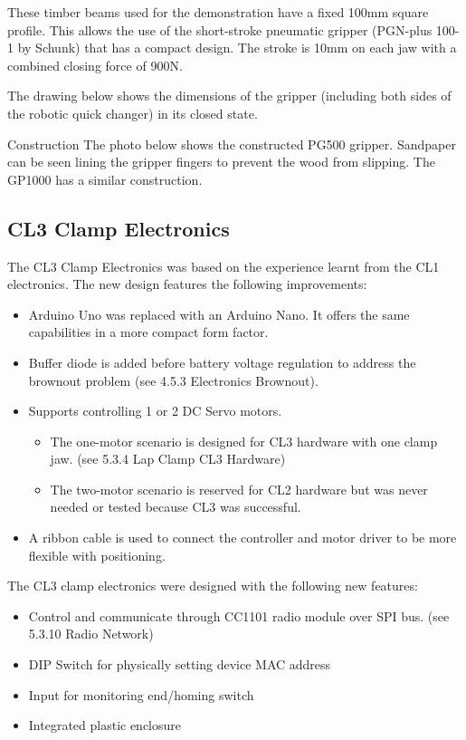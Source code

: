 \begin{itemize}
These timber beams used for the demonstration have a fixed 100mm square profile. This allows the use of the short-stroke pneumatic gripper (PGN-plus 100-1 by Schunk) that has a compact design. The stroke is 10mm on each jaw with a combined closing force of 900N. 

The drawing below shows the dimensions of the gripper (including both sides of the robotic quick changer) in its closed state. 

Construction
The photo below shows the constructed PG500 gripper. Sandpaper can be seen lining the gripper fingers to prevent the wood from slipping. The GP1000 has a similar construction. 

\subsection{CL3 Clamp Electronics}

The CL3 Clamp Electronics was based on the experience learnt from the CL1 electronics. The new design features the following improvements:
\begin{itemize}
\item Arduino Uno was replaced with an Arduino Nano. It offers the same capabilities in a more compact form factor.
\item Buffer diode is added before battery voltage regulation to address the brownout problem (see 4.5.3 Electronics Brownout).
\item Supports controlling 1 or 2 DC Servo motors. 
    \begin{itemize}
    \item The one-motor scenario is designed for CL3 hardware with one clamp jaw. (see 5.3.4 Lap Clamp CL3 Hardware)
    \item The two-motor scenario is reserved for CL2 hardware but was never needed or tested because CL3 was successful.
    \end{itemize}
\item A ribbon cable is used to connect the controller and motor driver to be more flexible with positioning.
\end{itemize}

The CL3 clamp electronics were designed with the following new features:
\begin{itemize}
\item Control and communicate through CC1101 radio module over SPI bus. (see 5.3.10 Radio Network)
\item DIP Switch for physically setting device MAC address
\item Input for monitoring end/homing switch
\item Integrated plastic enclosure
\end{itemize}


\end{itemize}
